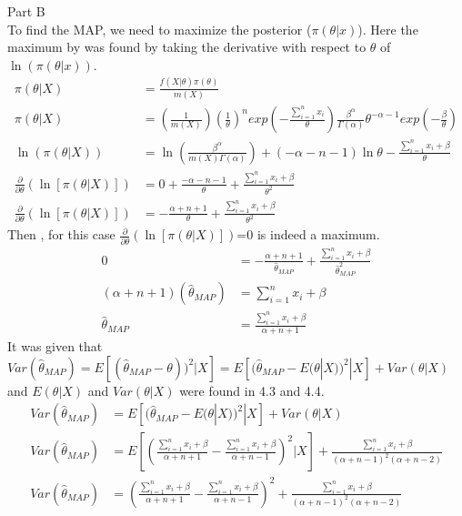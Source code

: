 \documentclass[11pt]{article}
\begin{document}
\vspace{5mm}
Part B \\
To find the MAP, we need to maximize the posterior ($\pi(\theta|x)$). Here the maximum by was found by taking the derivative with respect to $\theta$ of $\ln (\pi(\theta|x))$.  
\begin{align*}
\pi(\theta|X) &=\frac{ f(X| \theta) \pi (\theta)}{m(X)} \\
\pi(\theta|X) &=\left(\frac{1}{m(X)} \right) \left(\frac{1}{\theta} \right)^n exp\left(-\frac{\sum \limits_{i=1}^n x_i}{\theta} \right) \frac{\beta^\alpha}{\Gamma(\alpha)}\theta^{-\alpha-1} exp\left(-\frac{\beta}{\theta}\right) \\
\ln (\pi(\theta|X)) &= \ln \left(\frac{\beta^\alpha}{m(X) \Gamma(\alpha)} \right) +(-\alpha-n-1) \ln \theta -\frac{\sum_{i=1}^{n} x_i+\beta}{\theta} \\
\frac{\partial}{\partial \theta} \left( \ln [\pi(\theta|X)] \right) &= 0+\frac{-\alpha-n-1}{\theta}+\frac{\sum_{i=1}^{n} x_i+\beta}{\theta^2} \\
\frac{\partial}{\partial \theta} \left( \ln [\pi(\theta|X)] \right) &=-\frac{\alpha+n+1}{\theta}+\frac{\sum_{i=1}^{n} x_i+\beta}{\theta^2}
\end{align*}
Then , for this case $\frac{\partial}{\partial \theta} \left( \ln [\pi(\theta|X)] \right)$=0 is indeed a maximum.  
\begin{align*}
0 &=-\frac{\alpha+n+1}{\hat{\theta}_{MAP}}+\frac{\sum_{i=1}^{n} x_i+\beta}{\hat{\theta}_{MAP}^2} \\
(\alpha+n+1)(\hat{\theta}_{MAP}) &=\sum_{i=1}^{n} x_i+\beta \\
\hat{\theta}_{MAP} &= \frac{\sum_{i=1}^{n} x_i+\beta}{\alpha+n+1} 
\end{align*}
It was given that $Var(\hat{\theta}_{MAP})=E[(\hat{\theta}_{MAP}-\theta))^2|X]=E[(\hat{\theta}_{MAP}-E(\theta|X))^2|X]+Var(\theta|X)$ and $E(\theta|X)$ and $Var(\theta|X)$ were found in 4.3 and 4.4. 
\begin{align*}
Var(\hat{\theta}_{MAP}) &= E\left[(\hat{\theta}_{MAP}-E(\theta|X))^2|X\right]+Var\left(\theta|X\right) \\
Var(\hat{\theta}_{MAP}) &= E \left[ \left( \frac{\sum_{i=1}^{n} x_i+\beta}{\alpha+n+1} -\frac{\sum_{i=1}^n x_i+\beta}{\alpha+n-1} \right)^2 |X \right]+\frac{\sum_{i=1}^n x_i+\beta}{(\alpha+n-1)^2(\alpha+n-2)} \\
Var(\hat{\theta}_{MAP}) &=  \left( \frac{\sum_{i=1}^{n} x_i+\beta}{\alpha+n+1} -\frac{\sum_{i=1}^n x_i+\beta}{\alpha+n-1} \right)^2 +\frac{\sum_{i=1}^n x_i+\beta}{(\alpha+n-1)^2(\alpha+n-2)}
\end{align*}
\end{document}
